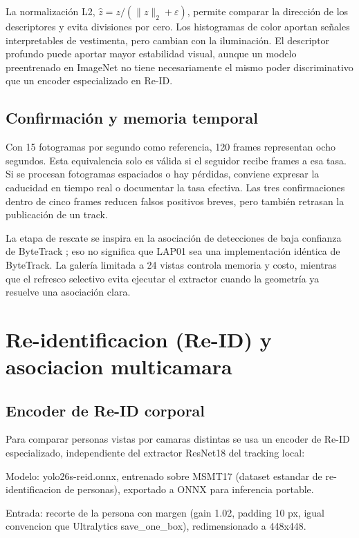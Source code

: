 \documentclass[12pt,letterpaper]{article}
\begin{document}
La normalización L2, $\hat{z}=z/(\|z\|_2+\varepsilon)$, permite comparar la dirección de los descriptores y evita divisiones por cero. Los histogramas de color aportan señales interpretables de vestimenta, pero cambian con la iluminación. El descriptor profundo puede aportar mayor estabilidad visual, aunque un modelo preentrenado en ImageNet no tiene necesariamente el mismo poder discriminativo que un encoder especializado en Re-ID.

\subsection{Confirmación y memoria temporal}
Con 15 fotogramas por segundo como referencia, 120 frames representan ocho segundos. Esta equivalencia solo es válida si el seguidor recibe frames a esa tasa. Si se procesan fotogramas espaciados o hay pérdidas, conviene expresar la caducidad en tiempo real o documentar la tasa efectiva. Las tres confirmaciones dentro de cinco frames reducen falsos positivos breves, pero también retrasan la publicación de un track.

La etapa de rescate se inspira en la asociación de detecciones de baja confianza de ByteTrack \cite{bytetrack}; eso no significa que LAP01 sea una implementación idéntica de ByteTrack. La galería limitada a 24 vistas controla memoria y costo, mientras que el refresco selectivo evita ejecutar el extractor cuando la geometría ya resuelve una asociación clara.

\section{Re-identificacion (Re-ID) y asociacion multicamara}

\subsection{Encoder de Re-ID corporal}

Para comparar personas vistas por camaras distintas se usa un encoder de Re-ID especializado, independiente del extractor ResNet18 del tracking local:


Modelo: yolo26s-reid.onnx, entrenado sobre MSMT17 (dataset estandar de re-identificacion de personas), exportado a ONNX para inferencia portable.


Entrada: recorte de la persona con margen (gain 1.02, padding 10 px, igual convencion que Ultralytics save\_\allowbreak one\_\allowbreak box), redimensionado a 448x448.
\end{document}
